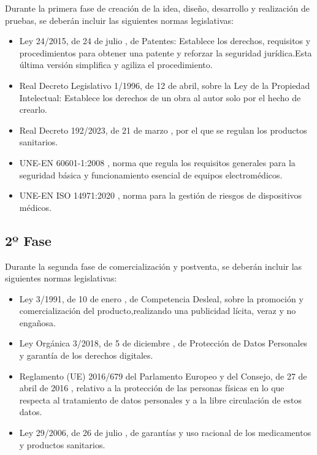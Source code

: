 Durante la primera fase de creación de la idea, diseño, desarrollo y realización de pruebas, se deberán incluir las siguientes normas legislativas: 

\begin{itemize}
    \item Ley 24/2015, de 24 de julio \cite{boe--2015-8328}, de Patentes: Establece los derechos, requisitos y procedimientos para obtener una patente y reforzar la seguridad jurídica.Esta última versión simplifica y agiliza el procedimiento.
    \item Real Decreto Legislativo 1/1996, de 12 de abril,\cite{boe--1996-8930} sobre la Ley de la Propiedad Intelectual: Establece los derechos de un obra al autor solo por el hecho de crearlo. 
    \item Real Decreto 192/2023, de 21 de marzo \cite{ministerio_de_sanidad_real_2023}, por el que se regulan los productos sanitarios. 
    \item UNE-EN 60601-1:2008 \cite{UNE2008}, norma que regula los requisitos generales para la seguridad básica y funcionamiento esencial de equipos electromédicos.
    \item UNE-EN ISO 14971:2020 \cite{UNE2020}, norma para la gestión de riesgos de dispositivos médicos.

\end{itemize}

\subsection{2º Fase}
Durante la segunda fase de comercialización y postventa, se deberán incluir las siguientes normas legislativas: 
\begin{itemize}
    \item Ley 3/1991, de 10 de enero \cite{boe--1991-628}, de Competencia Desleal, sobre la promoción y comercialización del producto,realizando una publicidad lícita, veraz y no engañosa.
    \item Ley Orgánica 3/2018, de 5 de diciembre \cite{boe--2018-16673}, de Protección de Datos Personales y garantía de los derechos digitales.
    \item Reglamento (UE) 2016/679 del Parlamento Europeo y del Consejo, de 27 de abril de 2016 \cite{boees}, relativo a la protección de las personas físicas en lo que respecta al tratamiento de datos personales y a la libre circulación de estos datos.
    \item Ley 29/2006, de 26 de julio \cite{boe--2006-13554}, de garantías y uso racional de los medicamentos y productos sanitarios.
\end{itemize}